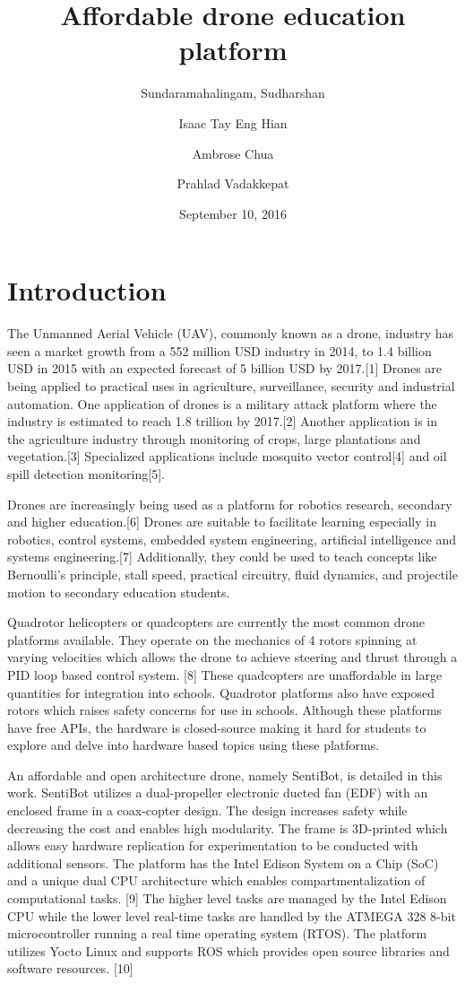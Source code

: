 \documentclass[12pt]{article}
\title{Affordable drone education platform}
\date{September 10, 2016}
\author{
	Sundaramahalingam, Sudharshan\\
	\and
	Isaac Tay Eng Hian\\
	\and
	Ambrose Chua\\
	\and
	Prahlad Vadakkepat
}
\begin{document}
\maketitle
{}
\newpage
{}

\section{Introduction}

The Unmanned Aerial Vehicle (UAV), commonly known as a drone, industry has seen a market growth from a 552 million USD industry in 2014, to 1.4 billion USD in 2015 with an expected forecast of 5 billion USD by 2017.[1]  Drones are being applied to practical uses in agriculture, surveillance, security and industrial automation. One application of drones is a military attack platform where the industry is estimated to reach 1.8 trillion by 2017.[2] Another application is in the agriculture industry through monitoring of crops, large plantations and vegetation.[3] Specialized applications include mosquito vector control[4] and oil spill detection monitoring[5]. 

Drones are increasingly being used as a platform for robotics research, secondary and higher education.[6]  Drones are suitable to facilitate learning especially in robotics, control systems, embedded system engineering, artificial intelligence and systems engineering.[7] Additionally, they could be used to teach concepts like Bernoulli’s principle, stall speed, practical circuitry, fluid dynamics, and projectile motion to secondary education students.

Quadrotor helicopters or quadcopters are currently the most common drone platforms available. They operate on the mechanics of 4 rotors spinning at varying velocities which allows the drone to achieve steering and thrust through a PID loop based control system. [8]   These quadcopters are unaffordable in large quantities for integration into schools. Quadrotor platforms also have exposed rotors which raises safety concerns for use in schools. Although these platforms have free APIs, the hardware is closed-source making it hard for students to explore and delve into hardware based topics using these platforms.

An affordable and open architecture drone, namely SentiBot, is detailed in this work. SentiBot utilizes a dual-propeller electronic ducted fan (EDF) with an enclosed frame in a coax-copter design. The design increases safety while decreasing the cost and enables high modularity. The frame is 3D-printed which allows easy hardware replication for experimentation to be conducted with additional sensors. The platform has the Intel Edison System on a Chip (SoC) and a unique dual CPU architecture which enables compartmentalization of computational tasks. [9] The higher level tasks are managed by the Intel Edison CPU while the lower level real-time tasks are handled by the ATMEGA 328 8-bit microcontroller running a real time operating system (RTOS). The platform utilizes Yocto Linux and supports ROS which provides open source libraries and software resources. [10]
\end{document}

